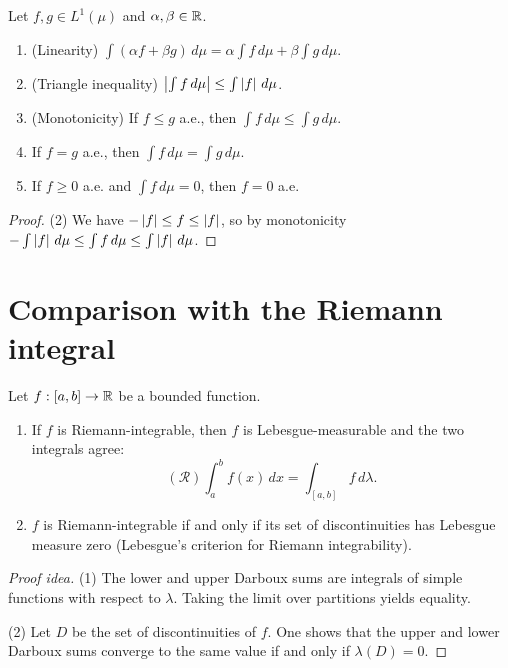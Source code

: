 \begin{theorem}
\label{thm:integral_properties}
Let $f, g \in L^1(\mu)$ and $\alpha, \beta \in \mathbb{R}$.
\begin{enumerate}
    \item (Linearity) $\int (\alpha f + \beta g)\, d\mu =
    \alpha \int f\, d\mu + \beta \int g\, d\mu$.
    \item (Triangle inequality) $\left| \int f\, d\mu \right| \leq \int \left| f \right|\, d\mu$.
    \item (Monotonicity) If $f \leq g$ a.e., then
    $\int f\, d\mu \leq \int g\, d\mu$.
    \item If $f = g$ a.e., then $\int f\, d\mu = \int g\, d\mu$.
    \item If $f \geq 0$ a.e. and $\int f\, d\mu = 0$, then $f = 0$ a.e.
\end{enumerate}
\end{theorem}

\begin{proof}
(2) We have $-\left| f \right| \leq f \leq \left| f \right|$, so by monotonicity
$-\int \left| f \right|\, d\mu \leq \int f\, d\mu \leq \int \left| f \right|\, d\mu$.
\end{proof}

\section{Comparison with the Riemann integral}

\begin{theorem}
Let $f : [a, b] \to \mathbb{R}$ be a bounded function.
\begin{enumerate}
    \item If $f$ is Riemann-integrable, then $f$ is Lebesgue-measurable and the
    two integrals agree:
    \[
    (\mathcal{R})\!\int_a^b f(x)\, dx = \int_{[a,b]} f\, d\lambda.
    \]
    \item $f$ is Riemann-integrable if and only if its set of discontinuities has
    Lebesgue measure zero (Lebesgue's criterion for Riemann integrability).
\end{enumerate}
\end{theorem}

\begin{proof}[Proof idea]
(1) The lower and upper Darboux sums are integrals of simple functions with respect
to $\lambda$. Taking the limit over partitions yields equality.

(2) Let $D$ be the set of discontinuities of $f$. One shows that the upper and
lower Darboux sums converge to the same value if and only if $\lambda(D) = 0$.
\end{proof}

